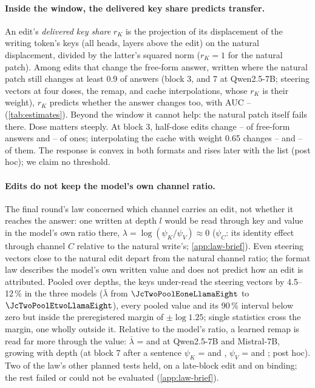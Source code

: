 \paragraph{Inside the window, the delivered key share predicts transfer.}
An edit's \emph{delivered key share} $r_K$ is the projection of its displacement of the writing token's keys (all heads, layers above the edit) on the natural displacement, divided by the latter's squared norm ($r_K = 1$ for the natural patch). Among edits that change the free-form answer, written where the natural patch still changes at least 0.9 of \fmtListA{} answers (block 3, and 7 at Qwen2.5-7B; steering vectors at four doses, the remap, and cache interpolations, whose $r_K$ is their weight), $r_K$ predicts whether the \fmtListA{} answer changes too, with AUC \NqAucMin--\NqAucMax{} (\cref{tab:estimates}). Beyond the window it cannot help: the natural patch itself fails there. Dose matters steeply. At block 3, half-dose edits change \NqHalfNoneMin--\NqHalfNoneMax{} of free-form answers and \NqHalfAfterMin--\NqHalfAfterMax{} of \fmtListA{} ones; interpolating the cache with weight 0.65 changes \NqDoseJSixtyfiveNoneThreeLlamaEight--\NqDoseJSixtyfiveNoneThreeQwenSeven{} and \NqDoseJSixtyfiveAfterThreeQwenSeven--\NqDoseJSixtyfiveAfterThreeLlamaEight{} of them. The response is convex in both formats and rises later with the list (post hoc); we claim no threshold.

\paragraph{Edits do not keep the model's own channel ratio.}
The final round's law concerned which channel carries an edit, not whether it reaches the answer: one written at depth $l$ would be read through key and value in the model's own ratio there, $\lambda = \log(\psi_K/\psi_V) \approx 0$ ($\psi_C$: its identity effect through channel $C$ relative to the natural write's; \cref{app:law-brief}). Even steering vectors close to the natural edit depart from the natural channel ratio; the format law describes the model's own written value and does not predict how an edit is attributed. %
Pooled over depths, the keys under-read the steering vectors by 4.5--12\,\% in the three models ($\bar\lambda$ from $\JcTwoPoolEoneLlamaEight$ to $\JcTwoPoolEtwoLlamaEight$), every pooled value and its 90\,\% interval below zero but inside the preregistered margin of $\pm\log 1.25$; single statistics cross the margin, one wholly outside it. Relative to the model's ratio, a learned remap is read far more through the value: $\bar\lambda$ = \ci{$\JcFourPoolEfourQwenSeven$}{$\JcFourPoolEfourQwenSevenLo$}{$\JcFourPoolEfourQwenSevenHi$} and \ci{$\JcFourPoolEfourMistralSeven$}{$\JcFourPoolEfourMistralSevenLo$}{$\JcFourPoolEfourMistralSevenHi$} at Qwen2.5-7B and Mistral-7B, growing with depth (at block 7 after a sentence $\psi_K$ = \JcFourPsiKWpostSevenQwenSeven{} and \JcFourPsiKWpostSevenMistralSeven, $\psi_V$ = \JcFourPsiVWpostSevenQwenSeven{} and \JcFourPsiVWpostSevenMistralSeven; post hoc). Two of the law's other planned tests held, on a late-block edit and on binding; the rest failed or could not be evaluated (\cref{app:law-brief}). %

